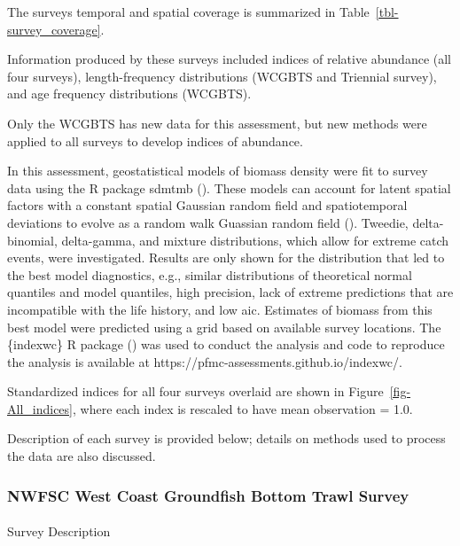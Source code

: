 \documentclass[
]{scrartcl}
\makeatletter
\let\oldparagraph\paragraph
\renewcommand{\paragraph}{
    \@ifstar
      \xxxParagraphStar
      \xxxParagraphNoStar
  }
\newcommand{\xxxParagraphStar}[1]{\oldparagraph*{#1}\mbox{}}
\newcommand{\xxxParagraphNoStar}[1]{\oldparagraph{#1}\mbox{}}
\makeatother
\begin{document}
The surveys temporal and spatial coverage is summarized in
Table~\ref{tbl-survey_coverage}.

Information produced by these surveys included indices of relative
abundance (all four surveys), length-frequency distributions (WCGBTS and
Triennial survey), and age frequency distributions (WCGBTS).

Only the WCGBTS has new data for this assessment, but new methods were
applied to all surveys to develop indices of abundance.

In this assessment, geostatistical models of biomass density were fit to
survey data using the R package \gls{sdmtmb}
(). These models
can account for latent spatial factors with a constant spatial Gaussian
random field and spatiotemporal deviations to evolve as a random walk
Guassian random field (). Tweedie, delta-binomial, delta-gamma, and mixture
distributions, which allow for extreme catch events, were investigated.
Results are only shown for the distribution that led to the best model
diagnostics, e.g., similar distributions of theoretical normal quantiles
and model quantiles, high precision, lack of extreme predictions that
are incompatible with the life history, and low \gls{aic}. Estimates of
biomass from this best model were predicted using a grid based on
available survey locations. The \{indexwc\} R package
() was used to
conduct the analysis and code to reproduce the analysis is available at
https://pfmc-assessments.github.io/indexwc/.

Standardized indices for all four surveys overlaid are shown in
Figure~\ref{fig-All_indices}, where each index is rescaled to have mean
observation = 1.0.

Description of each survey is provided below; details on methods used to
process the data are also discussed.

\subsubsection{NWFSC West Coast Groundfish Bottom Trawl
Survey}\label{nwfsc-west-coast-groundfish-bottom-trawl-survey}

\paragraph{Survey Description}\label{survey-description}
\end{document}
